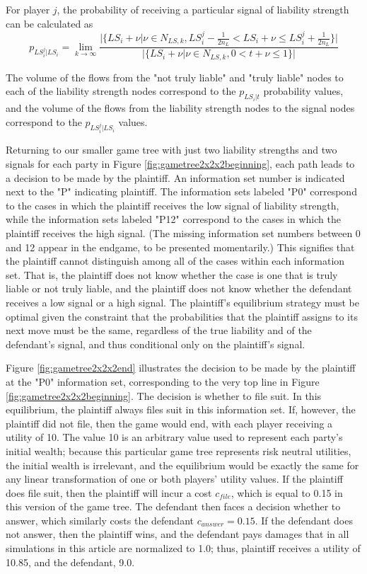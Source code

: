 \documentclass{article}
\begin{document}
For player $j$, the probability of receiving a particular signal of liability strength can be calculated as
\begin{equation} 
p_{LS_i^j|LS_i} = \lim_{k\to\infty} \frac{\lvert\{LS_i+\nu |\nu \in N_{LS,k}, LS_i^j - \frac{1}{2n_{L} }<LS_i+\nu \leq LS_i^j + \frac{1}{2n_{L} }\}\rvert}{\lvert\{LS_i+\nu |\nu \in N_{LS,k}, 0<t+\nu \leq 1 \}\rvert}
\end{equation}

\noindent The volume of the flows from the "not truly liable" and "truly liable" nodes to each of the liability strength nodes correspond to the $p_{LS_i|t}$ probability values, and the volume of the flows from the liability strength nodes to the signal nodes correspond to the $p_{LS_i^j|LS_i}$ values. 

Returning to our smaller game tree with just two liability strengths and two signals for each party in Figure \ref{fig:gametree2x2x2beginning}, each path leads to a decision to be made by the plaintiff. An information set number is indicated next to the "P" indicating plaintiff. The information sets labeled "P0" correspond to the cases in which the plaintiff receives the low signal of liability strength, while the information sets labeled "P12" correspond to the cases in which the plaintiff receives the high signal. (The missing information set numbers between 0 and 12 appear in the endgame, to be presented momentarily.) This signifies that the plaintiff cannot distinguish among all of the cases within each information set. That is, the plaintiff does not know whether the case is one that is truly liable or not truly liable, and the plaintiff does not know whether the defendant receives a low signal or a high signal. The plaintiff's equilibrium strategy must be optimal given the constraint that the probabilities that the plaintiff assigns to its next move must be the same, regardless of the true liability and of the defendant's signal, and thus conditional only on the plaintiff's signal. 

Figure \ref{fig:gametree2x2x2end} illustrates the decision to be made by the plaintiff at the "P0" information set, corresponding to the very top line in Figure \ref{fig:gametree2x2x2beginning}. The decision is whether to file suit. In this equilibrium, the plaintiff always files suit in this information set. If, however, the plaintiff did not file, then the game would end, with each player receiving a utility of 10. The value 10 is an arbitrary value used to represent each party's initial wealth; because this particular game tree represents risk neutral utilities, the initial wealth is irrelevant, and the equilibrium would be exactly the same for any linear transformation of one or both players' utility values. If the plaintiff does file suit, then the plaintiff will incur a cost $c_{file}$, which is equal to 0.15 in this version of the game tree. The defendant then faces a decision whether to answer, which similarly costs the defendant $c_{answer}=0.15$. If the defendant does not answer, then the plaintiff wins, and the defendant pays damages that in all simulations in this article are normalized to 1.0; thus, plaintiff receives a utility of 10.85, and the defendant, 9.0.
\end{document}

